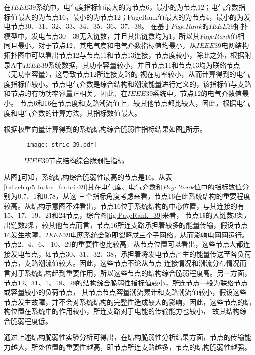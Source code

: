 在$IEEE39$系统中，电气度指标值最大的为节点6，最小的为节点12；电气介数指标值最大的为节点16，最小的为节点12；PageRank值最大的为节点4，最小的为发电节点30、31、32、33、34、35、36、37、38。
在基于$PageRank$的$IEEE39$拓扑模型中，发电节点30—38无入链数，并且其出链数均为1，所以其$PageRank$值相同且最小。对于节点12，其电气度和电气介数指标值均最小，从$IEEE39$电网结构
拓扑图中可以看出节点12与节点11和节点13连接，节点度较小，除此之外，根据附录A中$IEEE39$系统数据，其功率容量较小，并且节点11和节点13均为联络节点（无功率容量），这导致节点12所连接支路的
视在功率较小，从而计算得到的电气度指标值较小。节点电气介数是综合结构和潮流能量进行定义的，该指标值与支路和节点的有功功率容量正相关，因此，在$IEEE39$系统中，节点12的电气介数值最小。
节点6和16在节点度和支路潮流值上，较其他节点都比较大，因此，根据电气度和电气介数的计算方法，其指标数值最大。

根据权重向量计算得到的系统结构综合脆弱性指标结果如图\ref{fig:stric_39}所示。
\begin{figure}[H] %
  \centering
  \texttt{[image: stric\_39.pdf]}
  \caption{$IEEE39$节点结构综合脆弱性指标}
  \label{fig:stric_39}
\end{figure}

从图\ref{fig:stric_39}可知，系统结构综合脆弱性最高的节点是16。从表\ref{tab:chap5:Index_frabric39}其在电气度、电气介数和$PageRank$值中的指标数值分别为0.7、1和0.78，从这
三个指标角度考虑来看，节点16在此系统结构的重要程度较高。从结构示意图不难看出，节点16位于系统结构的中心位置，与其连接的有15、17、19、21和24节点，综合图\ref{fig:PageRank_39}来看，
节点16的入链数3条，出链数2条，较其他节点而言，节点16所连支路承担着较多的能量传输，假设节点16发生故障，$IEEE39$电网系统会随即裂解成三个子网络，从而影响电网网运行。节点2、4、6、
10、29的重要性也比较高，从节点位置可以看出，这些节点大都连接发电节点，如节点30、31、32、38，承担着将发电节点产生的能量传送至各负荷节点，支路潮流值较大。因此，这些节点不论从节点
连接情况和潮流分布情况而言对于系统结构起到重要作用，所以这些节点的结构综合脆弱程度高。另一方面，节点12、31、1、18、28的结构综合脆弱性指标值较小，所连节点一般为联络节点或容量较小的负荷节点，
其节点节点容量潮流累计和支路潮流值较小，假设这些节点发生故障，并不会对系统结构的完整性造成较大的影响，因此，这些节点的结构位置在系统中的作用较小，所连支路对于电能的传输能力也较小，
故其结构综合脆弱程度低。

通过上述结构脆弱性实验分析可得出，在结构脆弱性分析结果方面，节点的传输能力越大，所处位置的重要性越高，即节点所连支路越多，节点的结构脆弱性越强。

